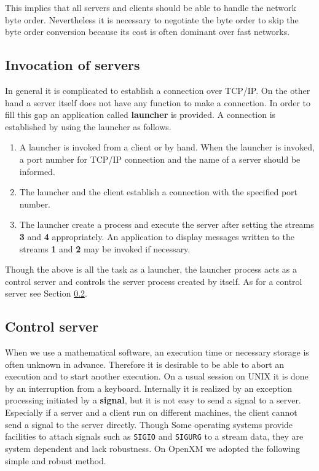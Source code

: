 This implies that all servers and clients should be able to
handle the network byte
order. Nevertheless it is necessary to negotiate the byte order to
skip the byte order conversion because its cost is often dominant over
fast networks.

\subsection{Invocation of servers}
\label{launcher}

In general it is complicated to establish a connection over TCP/IP.
On the other hand a server itself does not have any function to
make a connection. In order to fill this gap an application called
{\bf launcher} is provided. A connection is established by using
the launcher as follows.

\begin{enumerate}
\item A launcher is invoked from a client or by hand.
When the launcher is invoked, a port number for TCP/IP connection
and the name of a server should be informed.
\item The launcher and the client establish a connection with the
specified port number.
\item The launcher create a process and execute the server after
setting the streams {\bf 3} and {\bf 4} appropriately.
An application to display messages written to the streams {\bf 1} and
{\bf 2} may be invoked if necessary.
\end{enumerate}

Though the above is all the task as a launcher, the launcher process
acts as a control server and controls the server process created by
itself. As for a control server see Section \ref{control}.

\subsection{Control server}
\label{control}
When we use a mathematical software, an execution time or necessary
storage is often unknown in advance. Therefore it is desirable
to be able to abort an execution and to start another execution.
On a usual session on UNIX it is done by an interruption from a keyboard.
Internally it is realized by an exception processing initiated by
a {\bf signal}, but it is not easy to send a signal to a server.
Especially if a server and a client run on different machines,
the client cannot send a signal to the server directly.
Though Some operating systems provide facilities to attach 
signals such as {\tt SIGIO} and {\tt SIGURG} to a stream data, they are
system dependent and lack robustness.
On OpenXM we adopted the following simple and robust method.

